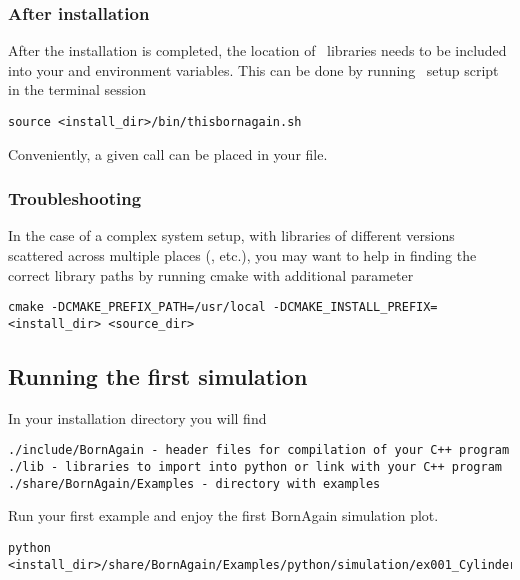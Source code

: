 \subsubsection{After installation}


After the installation is completed, the location of \BornAgain\ libraries needs to be included into your
 and  environment variables.
This can be done by running \BornAgain\ setup script in the terminal session
\begin{lstlisting}[language=shell, style=commandline]
source <install_dir>/bin/thisbornagain.sh
\end{lstlisting}
Conveniently, a given call can be placed in your  file.


\subsubsection{Troubleshooting}

In the case of a complex system setup, with libraries of different versions 
scattered across multiple places (,  etc.),
you may want to help  in finding the correct library paths
by running cmake with additional parameter 
\begin{lstlisting}[language=shell, style=commandline]
cmake -DCMAKE_PREFIX_PATH=/usr/local -DCMAKE_INSTALL_PREFIX=<install_dir> <source_dir>
\end{lstlisting}



\subsection{Running the first simulation}

In your installation directory you will find
\begin{lstlisting}[language=shell, style=commandline, keywordstyle=\color{black}]
./include/BornAgain - header files for compilation of your C++ program
./lib - libraries to import into python or link with your C++ program
./share/BornAgain/Examples - directory with examples
\end{lstlisting}

Run your first example and enjoy the first BornAgain simulation plot.
\begin{lstlisting}[language=shell, style=commandline]
python <install_dir>/share/BornAgain/Examples/python/simulation/ex001_CylindersAndPrisms/CylindersAndPrisms.py
\end{lstlisting}




